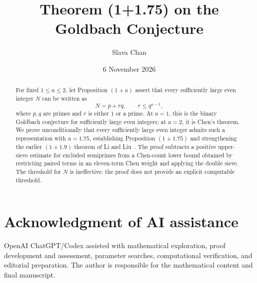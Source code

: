 \documentclass[11pt]{amsart}
\title{Theorem (1+1.75) on the Goldbach Conjecture}
\author{Slava Chan}
\date{6 November 2026}
\theoremstyle{definition}
\begin{document}
\begin{abstract}
For fixed $1\le a\le2$, let Proposition $(1+a)$ assert that every
sufficiently large even integer $N$ can be written as
\[
 N=p+rq,\qquad r\le q^{a-1},
\]
where $p,q$ are primes and $r$ is either $1$ or a prime.
At $a=1$, this is the binary Goldbach conjecture for sufficiently large
even integers; at $a=2$, it is Chen's theorem. We prove unconditionally
that every sufficiently large even integer admits such a representation
with $a=1.75$, establishing Proposition $(1+1.75)$ and strengthening
the earlier $(1+1.9)$ theorem of Li and Liu~\cite{LiLiu}.
The proof subtracts a positive upper-sieve estimate for excluded
semiprimes from a Chen-count lower bound obtained by restricting paired
terms in an eleven-term Chen weight and applying the double sieve.
The threshold for $N$ is ineffective: the proof does not provide an
explicit computable threshold.
\end{abstract}
\maketitle



\appendix




\section*{Acknowledgment of AI assistance}
OpenAI ChatGPT/Codex assisted with mathematical exploration, proof development
and assessment, parameter searches, computational verification, and editorial
preparation. The author is responsible for the mathematical content and final
manuscript.


\end{document}
